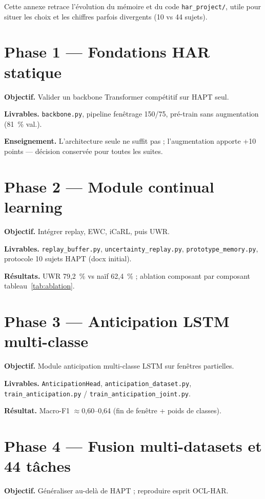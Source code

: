 \documentclass[a4paper,12pt]{report}
\begin{document}
Cette annexe retrace l'évolution du mémoire et du code \texttt{har\_project/},
utile pour situer les choix et les chiffres parfois divergents (10 vs 44 sujets).

\section{Phase 1 — Fondations HAR statique}

\textbf{Objectif.} Valider un backbone Transformer compétitif sur HAPT seul.

\textbf{Livrables.} \texttt{backbone.py}, pipeline fenêtrage 150/75, pré-train
sans augmentation (81~\% val.).

\textbf{Enseignement.} L'architecture seule ne suffit pas ; l'augmentation apporte
+10 points — décision conservée pour toutes les suites.

\section{Phase 2 — Module continual learning}

\textbf{Objectif.} Intégrer replay, EWC, iCaRL, puis UWR.

\textbf{Livrables.} \texttt{replay\_buffer.py}, \texttt{uncertainty\_replay.py},
\texttt{prototype\_memory.py}, protocole 10 sujets HAPT (docx initial).

\textbf{Résultats.} UWR 79,2~\% vs naïf 62,4~\% ; ablation composant par composant
tableau~\ref{tab:ablation}.

\section{Phase 3 — Anticipation LSTM multi-classe}

\textbf{Objectif.} Module anticipation multi-classe LSTM sur fenêtres partielles.

\textbf{Livrables.} \texttt{AnticipationHead}, \texttt{anticipation\_dataset.py},
\texttt{train\_anticipation.py} / \texttt{train\_anticipation\_joint.py}.

\textbf{Résultat.} Macro-F1 $\approx$0,60--0,64 (fin de fenêtre + poids de classes).

\section{Phase 4 — Fusion multi-datasets et 44 tâches}

\textbf{Objectif.} Généraliser au-delà de HAPT ; reproduire esprit OCL-HAR.
\end{document}

